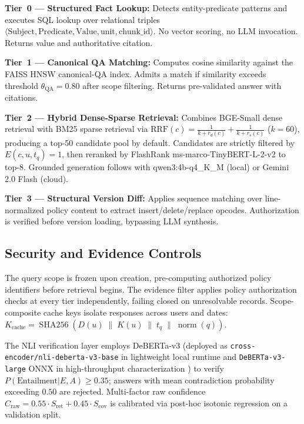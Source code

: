 \documentclass[journal]{IEEEtran}
\begin{document}
\textbf{Tier~0 --- Structured Fact Lookup:} Detects entity-predicate patterns and executes SQL lookup over relational triples $\langle\text{Subject},\text{Predicate},\text{Value},\text{unit},\text{chunk\_id}\rangle$. No vector scoring, no LLM invocation. Returns value and authoritative citation.

\textbf{Tier~1 --- Canonical QA Matching:} Computes cosine similarity against the FAISS HNSW canonical-QA index. Admits a match if similarity exceeds threshold $\theta_{\text{QA}}=0.80$ after scope filtering. Returns pre-validated answer with citations.

\textbf{Tier~2 --- Hybrid Dense-Sparse Retrieval:} Combines BGE-Small dense retrieval with BM25 sparse retrieval via $\text{RRF}(c)=\frac{1}{k+r_d(c)}+\frac{1}{k+r_s(c)}$ ($k=60$), producing a top-50 candidate pool by default. Candidates are strictly filtered by $E(c,u,t_q)=1$, then reranked by FlashRank ms-marco-TinyBERT-L-2-v2 to top-8. Grounded generation follows with qwen3:4b-q4\_K\_M (local) or Gemini 2.0 Flash (cloud).

\textbf{Tier~3 --- Structural Version Diff:} Applies sequence matching over line-normalized policy content to extract insert/delete/replace opcodes. Authorization is verified before version loading, bypassing LLM synthesis.

\subsection{Security and Evidence Controls}
The query scope is frozen upon creation, pre-computing authorized policy identifiers before retrieval begins. The evidence filter applies policy authorization checks at every tier independently, failing closed on unresolvable records. Scope-composite cache keys isolate responses across users and dates: $K_{\text{cache}}=\operatorname{SHA256}(D(u)\;\|\;K(u)\;\|\;t_q\;\|\;\operatorname{norm}(q))$.

The NLI verification layer employs DeBERTa-v3 (deployed as \texttt{cross-encoder/}\allowbreak\texttt{nli-deberta-v3-base} in lightweight local runtime and \texttt{DeBERTa-v3-large} ONNX in high-throughput characterization \cite{he2021deberta}) to verify $P(\text{Entailment}|E,A)\ge 0.35$; answers with mean contradiction probability exceeding $0.50$ are rejected. Multi-factor raw confidence $C_{\text{raw}}=0.55\cdot S_{\text{ret}}+0.45\cdot S_{\text{cov}}$ is calibrated via post-hoc isotonic regression on a validation split.
\end{document}
